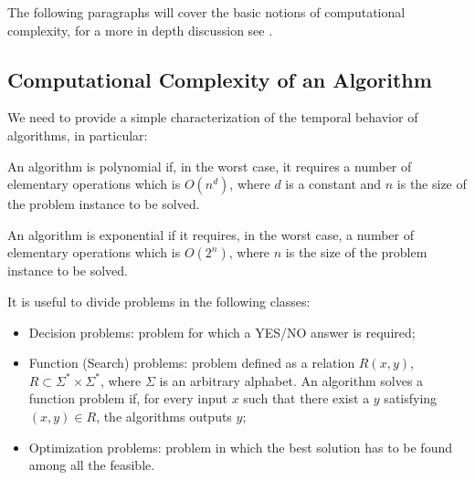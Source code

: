 The following paragraphs will cover the basic notions of computational complexity, for a more in depth discussion see \citep{Arora09,Papa94}.

\subsection{Computational Complexity of an Algorithm}
We need to provide a simple characterization of the temporal behavior of algorithms, in particular:
\begin{definition}
	An algorithm is polynomial if, in the worst case, it requires a number of elementary operations which is $O(n^{d})$, where $d$ is a constant and $n$ is the size of the problem instance to be solved.
\end{definition}
\begin{definition}
	An algorithm is exponential if it requires, in the worst case, a number of elementary operations which is $O(2^{n})$, where $n$ is the size of the problem instance to be solved.
\end{definition}
It is useful to divide problems in the following classes:
\begin{itemize}
	\item Decision problems: problem for which a YES/NO answer is required;
	\item Function (Search) problems: problem defined as a relation $R(x,y)$, $R\subset \Sigma^{\ast}\times\Sigma^{\ast}$, where $\Sigma$ is an arbitrary alphabet. An algorithm solves a function problem if, for every input $x$ such that there exist a $y$ satisfying $(x,y)\in R$, the algorithms outputs $y$;
	\item Optimization problems: problem in which the best solution has to be found among all the feasible.
\end{itemize}

